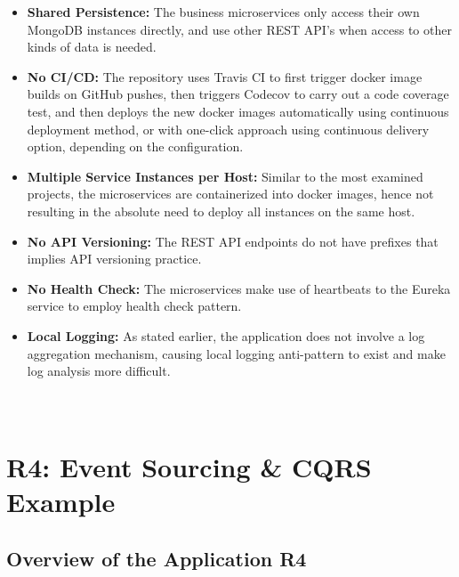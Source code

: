 \documentclass{Configuration_Files/PoliMi3i_thesis}
\begin{document}
\begin{itemize}
    \item \textbf{Shared Persistence:} The business microservices only access their own MongoDB instances directly, and use other REST API's when access to other kinds of data is needed.
    
    \item \textbf{No CI/CD:} The repository uses Travis CI\footnotemark[81] to first trigger docker image builds on GitHub pushes, then triggers Codecov\footnotemark[82] to carry out a code coverage test, and then deploys the new docker images automatically using continuous deployment method, or with one-click approach using continuous delivery option, depending on the configuration.
    
    \item \textbf{Multiple Service Instances per Host:} Similar to the most examined projects, the microservices are containerized into docker images, hence not resulting in the absolute need to deploy all instances on the same host.
    
    \item \textbf{No API Versioning:} The REST API endpoints do not have prefixes that implies API versioning practice.
    
    \item \textbf{No Health Check:} The microservices make use of heartbeats to the Eureka service to employ health check pattern.
    
    \item \textbf{Local Logging:} As stated earlier, the application does not involve a log aggregation mechanism, causing local logging anti-pattern to exist and make log analysis more difficult.\\\\\\
\end{itemize}

\section{R4: Event Sourcing \& CQRS Example}
\label{sec:R4}

\subsection{Overview of the Application R4}
\label{subsec:R4_overview}
\end{document}

